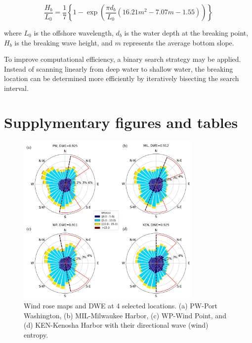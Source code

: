 \begin{equation}
  \frac{H_b}{L_0} = \frac{1}{7} \left\{ 1 - \exp(\frac{\pi d_b}{L_0}(16.21m^2-7.07m-1.55)) \right\} 
\label{eq:goda}
\end{equation}

where $L_0$ is the offshore wavelength, $d_b$ is the water depth at the breaking
point, $H_b$ is the breaking wave height, and $m$ represents the average bottom
slope.

To improve computational efficiency, a binary search strategy may be applied.
Instead of scanning linearly from deep water to shallow water, the breaking
location can be determined more efficiently by iteratively bisecting the search
interval.

\section{Supplymentary figures and tables}
\label{Supplymentary figures and tables}

\begin{figure}[htbp]
  \centering
  \includegraphics[width=0.8\textwidth]{appendix/resources/figure3-1a.jpg}
  \caption{Wind rose maps and DWE at 4 selected locations. (a) PW-Port Washington, (b) MIL-Milwaukee Harbor, (c) WP-Wind Point, and (d) KEN-Kenosha Harbor with their directional wave (wind) entropy.}
  \label{fig:fig3.1a}
\end{figure}

